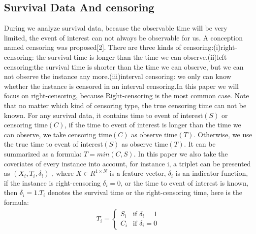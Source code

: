 \documentclass[conference]{IEEEconf}
\begin{document}
\subsection{Survival Data And censoring}
During we analyze survival data, because the observable time will be very limited, the event of interest can not always be observable for us. A conception named censoring was proposed[2].  There are three kinds of censoring:(i)right-censoring: the survival time is longer than the time we can observe.(ii)left-censoring:the survival time is shorter than the time we can observe, but we can not observe the instance any more.(iii)interval censoring: we only can know whether the instance is censored in an interval censoring.In this paper we will focus on right-censoring, because Right-censoring is the most common case. Note that no matter which kind of censoring type, the true censoring time can not be known.
For any survival data, it contains time to event of interest$(S)$ or censoring time$(C)$, if the time to event of interest is longer than the time we can observe, we take censoring time$(C)$ as observe time$(T)$. Otherwise, we use the true time to event of interest$(S)$ as observe time$(T)$. It can be summarized as a formula: $T = min(C,S)$. In this paper we also take the coveriates of every instance into account, for instance i, a triplet can be presented as  $(X_{i},T_{i},\delta_{i})$ , where $X\in R^{1\times N}$ is a feature vector, $\delta_{i}$ is an indicator function, if the instance is right-censoring $\delta_{i} = 0$, or the time to event of interest is known, then $\delta_{i} = 1$.$T_{i}$ denotes the survival time or the right-censoring time, here is the formula:
\begin{eqnarray}
	T_{i} = \begin{cases}
		S_{i} &\text{if } \delta_{i} = 1 \\
		C_{i} &\text{if } \delta_{i} = 0
	\end{cases}
\end{eqnarray}
\end{document}
